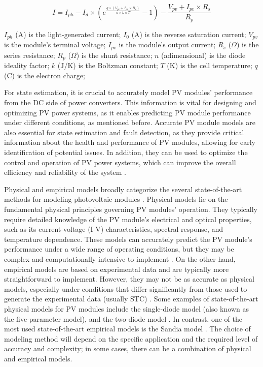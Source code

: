 \begin{equation} \label{eq:iv}
    I = I_{ph} - I_d \times (e^{\frac{q \times (V_{pv} + I_{pv} \times R_{s})}{n \times k \times T}} - 1) - \frac{V_{pv} + I_{pv} \times R_s}{R_p}
\end{equation}

$I_{ph}$ (A) is the light-generated current;
$I_{0}$ (A) is the reverse saturation current;
$V_{pv}$ is the module's terminal voltage;
$I_{pv}$ is the module's output current;
$R_{s}$ ($\Omega$) is the series resistance;
$R_{p}$ ($\Omega$) is the shunt resistance;
$n$ (adimensional) is the diode ideality factor;
$k$ (J/K) is the Boltzman constant;
$T$ (K) is the cell temperature;
$q$ (C) is the electron charge;

For state estimation, it is crucial to accurately model PV modules' performance from the DC side of power converters. This information is vital for designing and optimizing PV power systems, as it enables predicting PV module performance under different conditions, as mentioned before. Accurate PV module models are also essential for state estimation and fault detection, as they provide critical information about the health and performance of PV modules, allowing for early identification of potential issues. In addition, they can be used to optimize the control and operation of PV power systems, which can improve the overall efficiency and reliability of the system \cite{Braun2011}.

Physical and empirical models broadly categorize the several state-of-the-art methods for modeling photovoltaic modules \cite{Braun2011}. Physical models lie on the fundamental physical principles governing PV modules' operation. They typically require detailed knowledge of the PV module's electrical and optical properties, such as its current-voltage (I-V) characteristics, spectral response, and temperature dependence. These models can accurately predict the PV module's performance under a wide range of operating conditions, but they may be complex and computationally intensive to implement \cite{Kumar2019}. On the other hand, empirical models are based on experimental data and are typically more straightforward to implement. However, they may not be as accurate as physical models, especially under conditions that differ significantly from those used to generate the experimental data (usually STC) \cite{Braun2011}. Some examples of state-of-the-art physical models for PV modules include the single-diode model (also known as the five-parameter model), and the two-diode model \cite{Godina2017}. In contrast, one of the most used state-of-the-art empirical models is the Sandia model \cite{Braun2011}. The choice of modeling method will depend on the specific application and the required level of accuracy and complexity; in some cases, there can be a combination of physical and empirical models.

